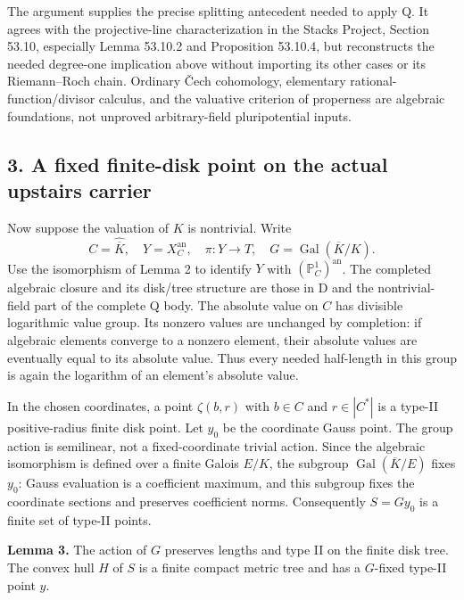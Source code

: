 \documentclass[
  11pt,
]{article}
\begin{document}
The argument supplies the precise splitting antecedent needed to apply
Q. It agrees with the projective-line characterization in the Stacks
Project, Section 53.10, especially Lemma 53.10.2 and Proposition
53.10.4, but reconstructs the needed degree-one implication above
without importing its other cases or its Riemann--Roch chain. Ordinary
Čech cohomology, elementary rational-function/divisor calculus, and the
valuative criterion of properness are algebraic foundations, not
unproved arbitrary-field pluripotential inputs.

\subsection{3. A fixed finite-disk point on the actual upstairs
carrier}\label{a-fixed-finite-disk-point-on-the-actual-upstairs-carrier}

Now suppose the valuation of \(K\) is nontrivial. Write \[
C=\widehat{\overline K},\quad Y=X_C^{\mathrm{an}},\quad
\pi:Y\longrightarrow T,\quad G=\operatorname{Gal}(\overline K/K).
\] Use the isomorphism of Lemma 2 to identify \(Y\) with
\((\mathbb P^1_C)^{\mathrm{an}}\). The completed algebraic closure and
its disk/tree structure are those in D and the nontrivial-field part of
the complete Q body. The absolute value on \(C\) has divisible
logarithmic value group. Its nonzero values are unchanged by completion:
if algebraic elements converge to a nonzero element, their absolute
values are eventually equal to its absolute value. Thus every needed
half-length in this group is again the logarithm of an element's
absolute value.

In the chosen coordinates, a point \(\zeta(b,r)\) with \(b\in C\) and
\(r\in|C^*|\) is a type-II positive-radius finite disk point. Let
\(y_0\) be the coordinate Gauss point. The group action is semilinear,
not a fixed-coordinate trivial action. Since the algebraic isomorphism
is defined over a finite Galois \(E/K\), the subgroup
\(\operatorname{Gal}(\overline K/E)\) fixes \(y_0\): Gauss evaluation is
a coefficient maximum, and this subgroup fixes the coordinate sections
and preserves coefficient norms. Consequently \(S=G y_0\) is a finite
set of type-II points.

\textbf{Lemma 3.} The action of \(G\) preserves lengths and type II on
the finite disk tree. The convex hull \(H\) of \(S\) is a finite compact
metric tree and has a \(G\)-fixed type-II point \(y\).
\end{document}

